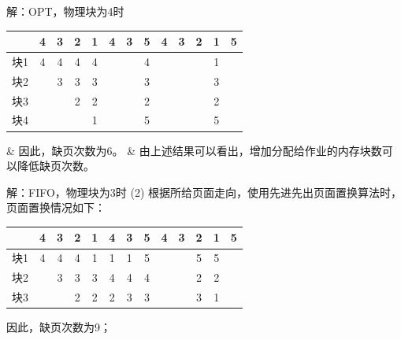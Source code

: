 \begin{frame}[fragile]{解：OPT，物理块为4时}
  \begin{center}
    \begin{tabular}{| l | c | c | c | c | c | c | c | c | c | c | c | c |}
      \hline
      \rowcolor{yellow!10}
      ~   & 4 & 3 & 2 & 1 & 4 & 3 & 5 & 4 & 3 & 2 & 1 & 5 \\
      \hline
      块1 & 4 & 4 & 4 & 4 & ~ & ~ & 4 & ~ & ~ & ~ & 1 & ~ \\ 
      块2 & ~ & 3 & 3 & 3 & ~ & ~ & 3 & ~ & ~ & ~ & 3 & ~ \\ 
      块3 & ~ & ~ & 2 & 2 & ~ & ~ & 2 & ~ & ~ & ~ & 2 & ~ \\
      块4 & ~ & ~ & ~ & 1 & ~ & ~ & 5 & ~ & ~ & ~ & 5 & ~ \\
      \hline
    \end{tabular}
  \end{center}

  \begin{easylist}
    & 因此，缺页次数为6。
    & 由上述结果可以看出，增加分配给作业的内存块数可以降低缺页次数。
  \end{easylist}
\end{frame}

\begin{frame}[fragile]{解：FIFO，物理块为3时}
  (2) 根据所给页面走向，使用先进先出页面置换算法时，页面置换情况如下：

  \begin{center}
    \begin{tabular}{| l | c | c | c | c | c | c | c | c | c | c | c | c |}
      \hline
      \rowcolor{yellow!10}
      ~   & 4 & 3 & 2 & 1 & 4 & 3 & 5 & 4 & 3 & 2 & 1 & 5 \\
      \hline
      块1 & 4 & 4 & 4 & 1 & 1 & 1 & 5 & ~ & ~ & 5 & 5 & ~ \\ 
      块2 & ~ & 3 & 3 & 3 & 4 & 4 & 4 & ~ & ~ & 2 & 2 & ~ \\ 
      块3 & ~ & ~ & 2 & 2 & 2 & 3 & 3 & ~ & ~ & 3 & 1 & ~ \\
      \hline
    \end{tabular}
  \end{center}

  因此，缺页次数为9；
\end{frame}


